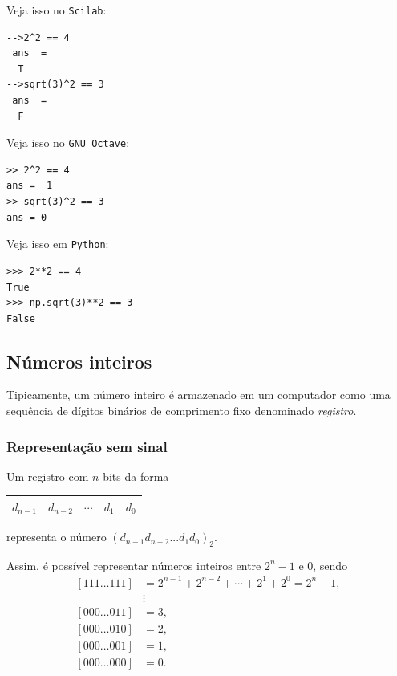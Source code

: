 \ifisscilab
Veja isso no \verb+Scilab+:
\begin{verbatim}
-->2^2 == 4
 ans  =
  T  
-->sqrt(3)^2 == 3
 ans  =
  F  
\end{verbatim}
\fi
\ifisoctave
Veja isso no \verb+GNU Octave+:
\begin{verbatim}
>> 2^2 == 4
ans =  1
>> sqrt(3)^2 == 3
ans = 0
\end{verbatim}
\fi
\ifispython
Veja isso em \verb+Python+:
\begin{verbatim}
>>> 2**2 == 4
True
>>> np.sqrt(3)**2 == 3
False
\end{verbatim}
\fi

\subsection{Números inteiros}

Tipicamente, um número inteiro é armazenado em um computador como uma sequência de dígitos binários de comprimento fixo denominado \emph{registro}.

\subsubsection{Representação sem sinal}
Um registro com $n$ bits da forma
 \begin{center}
   \begin{tabular}{|c|c|c|c|c|}\hline
     $d_{n-1}$ & $d_{n-2}$ & $\cdots$ & $d_1$ & $d_0$\\\hline
   \end{tabular}  
 \end{center}
representa o número $(d_{n-1}d_{n-2}...d_1d_0)_2$. 

Assim, é possível representar números inteiros entre $2^n-1$ e $0$, sendo
\begin{equation*}
\begin{split}
  [111\ldots 111] & = 2^{n-1}+2^{n-2}+\cdots+2^1+2^0=2^n-1,\\
                &\vdots\\
  [000\ldots 011] &= 3, \\
  [000\ldots 010] &= 2, \\
  [000\ldots 001] &= 1, \\
  [000\ldots 000] & = 0. 
\end{split}
\end{equation*}


